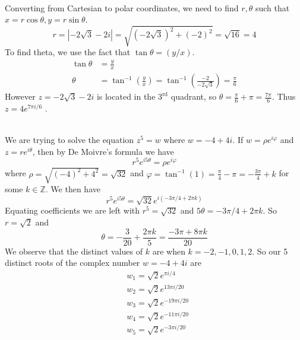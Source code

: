 \documentclass{article}
\newenvironment{problem}[2][Problem]{\begin{trivlist}
		\item[\hskip \labelsep {\bfseries #1}\hskip \labelsep {\bfseries #2.}]}{\end{trivlist}}
\begin{document}
	\begin{problem}{1.81(f)} $  $\\ \\
		Converting from Cartesian to polar coordinates, we need to find $ r,\theta $ such that $ x = r\cos\theta, y=r\sin\theta $.
		$$ r = | -2\sqrt{3} - 2i | = \sqrt{(-2\sqrt{3})^2 + (-2)^2} = \sqrt{16} = 4 $$
		To find theta, we use the fact that $ \tan\theta = (y/x) $.
		\begin{align*}
			\tan\theta &= \frac{y}{x} \\
			\theta &= \tan^{-1}\left(\frac{y}{x}\right) = \tan^{-1} \left( \frac{-2}{-2\sqrt{3}} \right) = \frac{\pi}{6}
		\end{align*}
		However $ z = -2\sqrt{3} -2i $ is located in the $ 3^{\text{rd}} $ quadrant, so $ \theta = \frac{\pi}{6} + \pi = \frac{7\pi}{6} $. Thus $ z = \boxed{4e^{7\pi i/6}} $ .
	\end{problem}
	
	\begin{problem}{1.95(b)} $  $ \\ \\
		We are trying to solve the equation $ z^5 = w $ where $ w = -4+4i $. If $ w = \rho e^{i\varphi} $ and $ z = re^{i\theta} $, then by De Moivre's formula we have
		\[
			r^5 e^{i5\theta} = \rho e^{i\varphi}
		\]
		where $ \rho = \sqrt{(-4)^2+4^2} = \sqrt{32} $ and $ \varphi = \tan^{-1}(1) = \frac{\pi}{4}-\pi = -\frac{3\pi}{4} + k $ for some $ k \in \mathbb{Z}$. We then have 
		\[
			r^5 e^{i5\theta} = \sqrt{32}e^{i(-3\pi/4+2\pi k)}
		\]
		Equating coefficients we are left with $ r^5 = \sqrt{32} $ and $ 5\theta = -3\pi/4+2\pi k $. So $ r = \sqrt{2} $ and 
		\[
			\theta = -\frac{3}{20} + \frac{2\pi k}{5} = \frac{-3\pi + 8\pi k}{20}
		\]
		We observe that the distinct values of $ k $ are when $ k=-2,-1,0,1,2 $. So our 5 distinct roots of the complex number $ w= -4+4i $ are 
		\begin{align*}
			&w_1 = \sqrt{2} e^{\pi i/4} \\
			&w_2 = \sqrt{2} e^{13\pi i/20} \\
			&w_3 = \sqrt{2} e^{-19\pi i/20} \\
			&w_4 = \sqrt{2} e^{-11\pi i/20} \\
			&w_5 = \sqrt{2} e^{-3\pi i/20} \\
		\end{align*}
	\end{problem}
\end{document}
